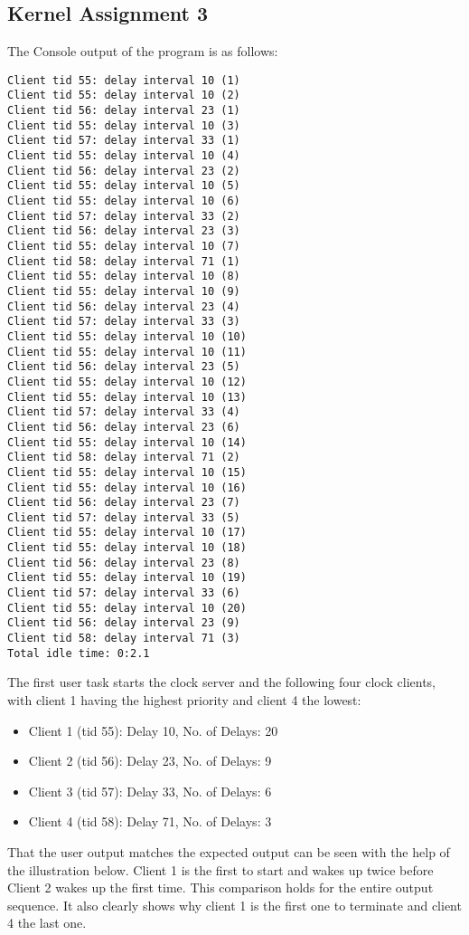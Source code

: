 \documentclass[12pt, titlepage]{article}
\begin{document}
    \subsection{Kernel Assignment 3}
    The Console output of the program is as follows: 
    \begin{verbatim}
Client tid 55: delay interval 10 (1)
Client tid 55: delay interval 10 (2)
Client tid 56: delay interval 23 (1)
Client tid 55: delay interval 10 (3)
Client tid 57: delay interval 33 (1)
Client tid 55: delay interval 10 (4)
Client tid 56: delay interval 23 (2)
Client tid 55: delay interval 10 (5)
Client tid 55: delay interval 10 (6)
Client tid 57: delay interval 33 (2)
Client tid 56: delay interval 23 (3)
Client tid 55: delay interval 10 (7)
Client tid 58: delay interval 71 (1)
Client tid 55: delay interval 10 (8)
Client tid 55: delay interval 10 (9)
Client tid 56: delay interval 23 (4)
Client tid 57: delay interval 33 (3)
Client tid 55: delay interval 10 (10)
Client tid 55: delay interval 10 (11)
Client tid 56: delay interval 23 (5)
Client tid 55: delay interval 10 (12)
Client tid 55: delay interval 10 (13)
Client tid 57: delay interval 33 (4)
Client tid 56: delay interval 23 (6)
Client tid 55: delay interval 10 (14)
Client tid 58: delay interval 71 (2)
Client tid 55: delay interval 10 (15)
Client tid 55: delay interval 10 (16)
Client tid 56: delay interval 23 (7)
Client tid 57: delay interval 33 (5)
Client tid 55: delay interval 10 (17)
Client tid 55: delay interval 10 (18)
Client tid 56: delay interval 23 (8)
Client tid 55: delay interval 10 (19)
Client tid 57: delay interval 33 (6)
Client tid 55: delay interval 10 (20)
Client tid 56: delay interval 23 (9)
Client tid 58: delay interval 71 (3)
Total idle time: 0:2.1
    \end{verbatim}
    The first user task starts the clock server and the following four clock clients, with client 1 having the highest priority and client 4 the lowest:
    \begin{itemize}
        \item Client 1 (tid 55):    Delay 10,   No. of Delays: 20
        \item Client 2 (tid 56):    Delay 23,   No. of Delays: 9
        \item Client 3 (tid 57):    Delay 33,   No. of Delays: 6
        \item Client 4 (tid 58):    Delay 71,   No. of Delays: 3
    \end{itemize}

    That the user output matches the expected output can be seen with the help of the illustration below. 
    Client 1 is the first to start and wakes up twice before Client 2 wakes up the first time. 
    This comparison holds for the entire output sequence. It also clearly shows why client 1 is the first one to terminate and client 4 the last one. 
\end{document}

